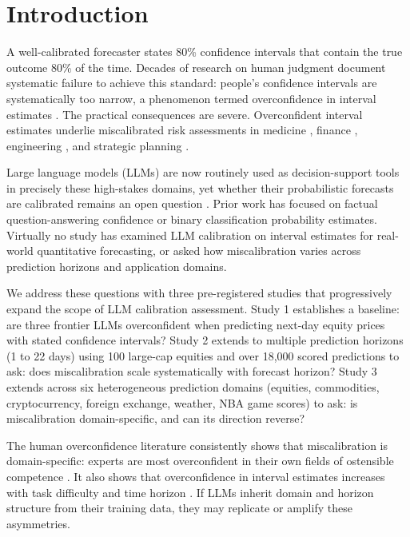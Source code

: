 \section{Introduction}
\label{sec:introduction}

A well-calibrated forecaster states 80\% confidence intervals that contain the true
outcome 80\% of the time. Decades of research on human judgment document systematic
failure to achieve this standard: people's confidence intervals are systematically
too narrow, a phenomenon termed overconfidence in interval estimates \citep{Alpert1982,
Lichtenstein1982, Klayman1999, Soll2004}. The practical consequences are severe.
Overconfident interval estimates underlie miscalibrated risk assessments in medicine
\citep{ChristensenSzalanski1981}, finance \citep{BenDavid2013}, engineering
\citep{Flyvbjerg2002}, and strategic planning \citep{Lovallo2003}.

Large language models (LLMs) are now routinely used as decision-support tools in
precisely these high-stakes domains, yet whether their probabilistic forecasts are
calibrated remains an open question \citep{Kadavath2022, Lin2022, Xiong2024}. Prior
work has focused on factual question-answering confidence or binary classification
probability estimates. Virtually no study has examined LLM calibration on interval
estimates for real-world quantitative forecasting, or asked how miscalibration varies
across prediction horizons and application domains.

We address these questions with three pre-registered studies that progressively
expand the scope of LLM calibration assessment. Study 1 establishes a baseline:
are three frontier LLMs overconfident when predicting next-day equity prices with
stated confidence intervals? Study 2 extends to multiple prediction horizons (1 to
22 days) using 100 large-cap equities and over 18,000 scored predictions to ask:
does miscalibration scale systematically with forecast horizon? Study 3 extends
across six heterogeneous prediction domains (equities, commodities, cryptocurrency,
foreign exchange, weather, NBA game scores) to ask: is miscalibration domain-specific,
and can its direction reverse?

The human overconfidence literature consistently shows that miscalibration is
domain-specific: experts are most overconfident in their own fields of ostensible
competence \citep{Klayman1999, Soll2004}. It also shows that overconfidence in
interval estimates increases with task difficulty and time horizon \citep{Griffin1992}.
If LLMs inherit domain and horizon structure from their training data, they may
replicate or amplify these asymmetries.

